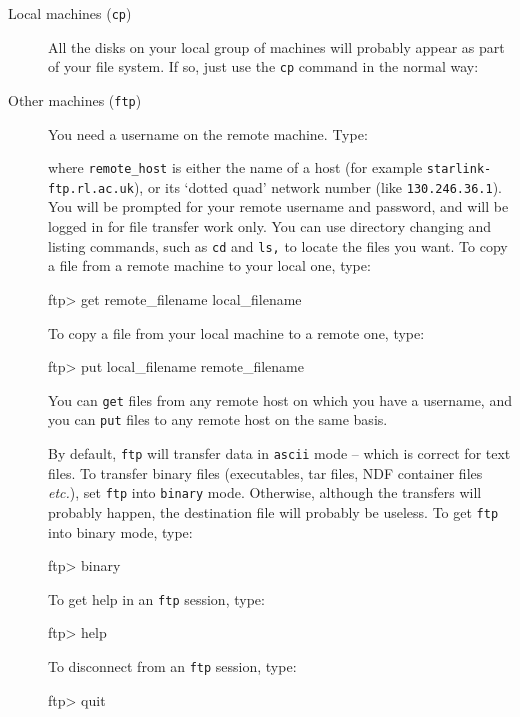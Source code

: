 \documentclass[twoside,11pt,nolof]{starlink}
\begin{document}
\begin{description}
\item [Local machines (\texttt{cp})] \hspace*{\fill}

All the disks on your local group of machines will probably appear as part of
your file system.
If so, just use the \texttt{cp} command in the normal way:
\begin{terminalv}
\end{terminalv}

\item [Other machines (\texttt{ftp})] \hspace*{\fill}

You need a username on the remote machine.
Type:
\begin{terminalv}
\end{terminalv}
where \texttt{remote\_host} is either the name of a host (for example
\texttt{starlink-ftp.rl.ac.uk}), or its `dotted quad' network number (like
\texttt{130.246.36.1}).
You will be prompted for your remote username and password, and will be
logged in for file transfer work only.
You can use directory changing and listing commands, such as \texttt{cd} and
\texttt{ls,} to locate the files you want.
To copy a file from a remote machine to your local one, type:
\begin{terminalv}
ftp> get remote_filename local_filename
\end{terminalv}
To copy a file from your local machine to a remote one, type:
\begin{terminalv}
ftp> put local_filename remote_filename
\end{terminalv}
You can \texttt{get} files from any remote host on which you have a username,
and you can \texttt{put} files to any remote host on the same basis.

By default, \texttt{ftp} will transfer data in \texttt{ascii} mode -- which is
correct for text files.
To transfer binary files (executables, tar files, NDF container files
\emph{etc.}), set \texttt{ftp} into \texttt{binary} mode.
Otherwise, although the transfers will probably happen, the destination file
will probably be useless.
To get \texttt{ftp} into binary mode, type:
\begin{terminalv}
ftp> binary
\end{terminalv}
To get help in an \texttt{ftp} session, type:
\begin{terminalv}
ftp> help
\end{terminalv}
To disconnect from an \texttt{ftp} session, type:
\begin{terminalv}
ftp> quit
\end{terminalv}
\end{description}
\end{document}
